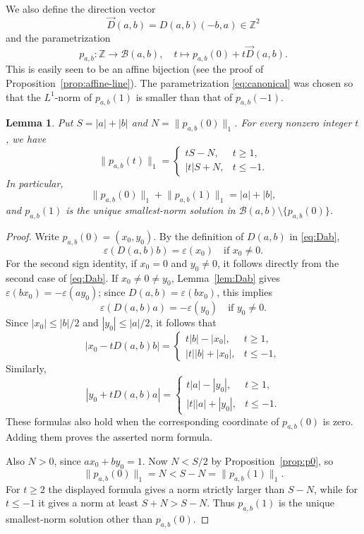 \documentclass[12pt,letterpaper]{article}
\numberwithin{equation}{section}
\newcommand{\Z}{\mathbb Z}
\newcommand{\B}{\mathcal B}
\newcommand{\eps}{\varepsilon}
\newcommand{\normone}[1]{\lVert #1\rVert_1}
\theoremstyle{plain}
\newtheorem{lemma}[theorem]{Lemma}
\theoremstyle{definition}
\begin{document}
We also define the direction vector
\[
\vec{D}(a,b)=D(a,b)(-b,a)\in\Z^2
\]
and the parametrization
\begin{equation}\label{eq:canonical}
 p_{a,b}:\Z\to\B(a,b),\quad t\mapsto p_{a,b}(0)+t\vec{D}(a,b).
\end{equation}
This is easily seen to be an affine bijection (see the proof of Proposition~\ref{prop:affine-line}). The parametrization \eqref{eq:canonical} was chosen so that the $L^1$-norm of $p_{a,b}(1)$ is smaller than that of $p_{a,b}(-1)$.

\begin{lemma}\label{lem:norm-profile}
Put $S=|a|+|b|$ and $N=\normone{p_{a,b}(0)}$. For every nonzero integer $t$, we have
\begin{equation}\label{eq:norm-profile}
 \normone{p_{a,b}(t)}=
 \begin{cases}
  tS-N,&t\ge1,\\
  |t|S+N,&t\le-1.
 \end{cases}
\end{equation}
In particular,
\[
 \normone{p_{a,b}(0)}+\normone{p_{a,b}(1)}=|a|+|b|,
\]
and $p_{a,b}(1)$ is the unique smallest-norm solution in
$\B(a,b)\setminus\{p_{a,b}(0)\}$.
\end{lemma}

\begin{proof}
Write $p_{a,b}(0)=(x_0,y_0)$. By the definition of $D(a,b)$ in \eqref{eq:Dab},
\[
 \eps(D(a,b)b)=\eps(x_0)\quad\text{if }x_0\ne0.
\]
For the second sign identity, if $x_0=0$ and $y_0\ne0$, it follows directly from the second case of \eqref{eq:Dab}. If $x_0\ne0\ne y_0$, Lemma~\ref{lem:Dab} gives $\eps(bx_0)=-\eps(ay_0)$; since $D(a,b)=\eps(bx_0)$, this implies
\[
 \eps(D(a,b)a)=-\eps(y_0)\quad\text{if }y_0\ne0.
\]
Since $|x_0|\le|b|/2$ and $|y_0|\le|a|/2$, it follows that
\[
 |x_0-tD(a,b)b|=
 \begin{cases}
  t|b|-|x_0|,&t\ge1,\\
  |t||b|+|x_0|,&t\le-1,
 \end{cases}
\]
Similarly,
\[
 |y_0+tD(a,b)a|=
 \begin{cases}
  t|a|-|y_0|,&t\ge1,\\
  |t||a|+|y_0|,&t\le-1.
 \end{cases}
\]
These formulas also hold when the corresponding coordinate of $p_{a,b}(0)$ is zero. Adding them proves the asserted norm formula.

Also $N>0$, since $ax_0+by_0=1$. Now $N<S/2$ by Proposition~\ref{prop:p0}, so
\[
 \normone{p_{a,b}(0)}=N<S-N=\normone{p_{a,b}(1)}.
\]
For $t\ge2$ the displayed formula gives a norm strictly larger than $S-N$, while for $t\le-1$ it gives a norm at least $S+N>S-N$. Thus $p_{a,b}(1)$ is the unique smallest-norm solution other than $p_{a,b}(0)$.
\end{proof}
\end{document}
